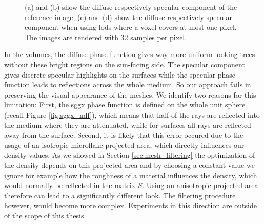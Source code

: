 \begin{figure}[ht]
\begin{subfigure}[b]{0.49\linewidth}
        \caption{}
    \end{subfigure}
    \caption[Diffuse and specular components rendered seperately]{(a) and (b) show the diffuse respectively specular component of the reference image, (c) and (d) show the diffuse respectively specular component when using \acsp{lod} where a voxel covers at most one pixel. The images are rendered with 32 samples per pixel.}
	\label{fig:diffuse_specular_breakdown}
\end{figure}
In the volumes, the diffuse phase function gives way more uniform looking trees without these bright regions on the sun-facing side.
The specular component gives discrete specular highlights on the surfaces while the specular phase function leads to reflections across the whole medium.
So our approach fails in preserving the visual appearance of the meshes.
We identify two reasons for this limitation: First, the \ac{sggx} phase function is defined on the whole unit sphere (recall Figure \ref{fig:sggx_ndf}), which means that half of the rays are reflected into the medium where they are attenuated, while for surfaces all rays are reflected away from the surface.
Second, it is likely that this error occured due to the usage of an isotropic microflake projected area, which directly influences our density values.
As we showed in Section \ref{sec:mesh_filtering} the optimization of the density depends on this projected area and by choosing a constant value we ignore for example how the roughness of a material influences the density, which would normally be reflected in the matrix $S$.
Using an anisotropic projected area therefore can lead to a significantly different look.
The filtering procedure however, would become more complex.
Experiments in this direction are outside of the scope of this thesis.



